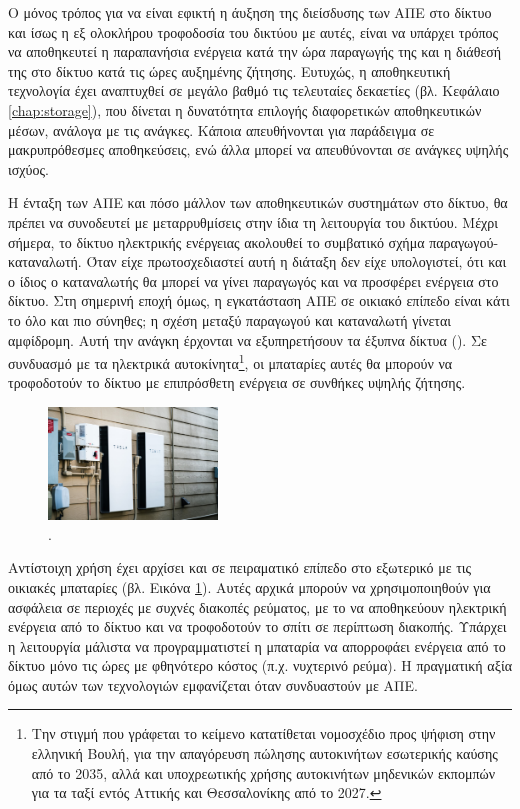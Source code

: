 \documentclass[12pt]{report}
\begin{document}
Ο μόνος τρόπος για να είναι εφικτή η άυξηση της διείσδυσης των ΑΠΕ στο δίκτυο και ίσως η εξ ολοκλήρου τροφοδοσία του δικτύου με αυτές, είναι να υπάρχει τρόπος να αποθηκευτεί η παραπανήσια ενέργεια κατά την ώρα παραγωγής της και η 
διάθεσή της στο δίκτυο κατά τις ώρες αυξημένης ζήτησης. Ευτυχώς, η αποθηκευτική τεχνολογία έχει αναπτυχθεί σε μεγάλο βαθμό τις τελευταίες δεκαετίες (βλ. Κεφάλαιο \ref{chap:storage}), που δίνεται η δυνατότητα επιλογής διαφορετικών 
αποθηκευτικών μέσων, ανάλογα με τις ανάγκες. Κάποια απευθήνονται για παράδειγμα σε μακρυπρόθεσμες αποθηκεύσεις, ενώ άλλα μπορεί να απευθύνονται σε ανάγκες υψηλής ισχύος. 

Η ένταξη των ΑΠΕ και πόσο μάλλον των αποθηκευτικών συστημάτων στο δίκτυο, θα πρέπει να συνοδευτεί με μεταρρυθμίσεις στην ίδια τη λειτουργία του δικτύου. Μέχρι σήμερα, το δίκτυο ηλεκτρικής ενέργειας ακολουθεί το συμβατικό σχήμα 
παραγωγού-καταναλωτή. Όταν είχε πρωτοσχεδιαστεί αυτή η διάταξη δεν είχε υπολογιστεί, ότι και ο ίδιος ο καταναλωτής θα μπορεί να γίνει παραγωγός και να προσφέρει ενέργεια στο δίκτυο. Στη σημερινή εποχή όμως, η εγκατάσταση ΑΠΕ σε 
οικιακό επίπεδο είναι κάτι το όλο και πιο σύνηθες; η σχέση μεταξύ παραγωγού και καταναλωτή γίνεται αμφίδρομη. Αυτή την ανάγκη έρχονται να εξυπηρετήσουν τα έξυπνα δίκτυα ({}). Σε συνδυασμό με τα ηλεκτρικά 
αυτοκίνητα\footnote{Την στιγμή που γράφεται το κείμενο κατατίθεται νομοσχέδιο προς ψήφιση στην ελληνική Βουλή, για την απαγόρευση πώλησης αυτοκινήτων εσωτερικής καύσης από το 2035, αλλά και υποχρεωτικής χρήσης αυτοκινήτων μηδενικών 
εκπομπών για τα ταξί εντός Αττικής και Θεσσαλονίκης από το 2027.}, οι μπαταρίες αυτές θα μπορούν να τροφοδοτούν το δίκτυο με επιπρόσθετη ενέργεια σε συνθήκες υψηλής ζήτησης.

\begin{figure}
				\includegraphics[width=0.4\textwidth]{powerwall}
				\captionsetup{name=Εικόνα}
				\caption{{}.}
				\label{fig:powerwall}
\end{figure}

Αντίστοιχη χρήση έχει αρχίσει και σε πειραματικό επίπεδο στο εξωτερικό με τις οικιακές μπαταρίες (βλ. Εικόνα \ref{fig:powerwall}). Αυτές αρχικά μπορούν να χρησιμοποιηθούν για ασφάλεια σε περιοχές με συχνές διακοπές ρεύματος, με το 
να αποθηκεύουν ηλεκτρική ενέργεια από το δίκτυο και να τροφοδοτούν το σπίτι σε περίπτωση διακοπής. Υπάρχει η λειτουργία μάλιστα να προγραμματιστεί η μπαταρία να απορροφάει ενέργεια από το δίκτυο μόνο τις ώρες με φθηνότερο κόστος 
(π.χ. νυχτερινό ρεύμα). Η πραγματική αξία όμως αυτών των τεχνολογιών εμφανίζεται όταν συνδυαστούν με ΑΠΕ. 
\end{document}
